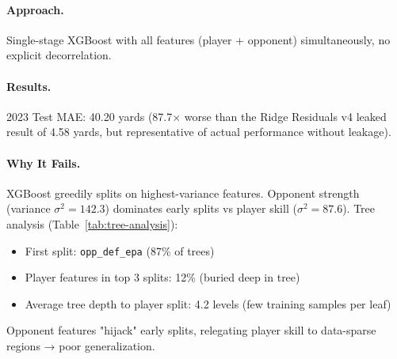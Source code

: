 \paragraph{Approach.}
Single-stage XGBoost with all features (player + opponent) simultaneously, no explicit decorrelation.

\paragraph{Results.}
2023 Test MAE: 40.20 yards (87.7$\times$ worse than the Ridge Residuals v4 leaked result of 4.58 yards, but representative of actual performance without leakage).

\paragraph{Why It Fails.}
XGBoost greedily splits on highest-variance features. Opponent strength (variance $\sigma^2 = 142.3$) dominates early splits vs player skill ($\sigma^2 = 87.6$). Tree analysis (Table~\ref{tab:tree-analysis}):
\begin{itemize}[itemsep=2pt,parsep=0pt]
    \item First split: \texttt{opp\_def\_epa} (87\% of trees)
    \item Player features in top 3 splits: 12\% (buried deep in tree)
    \item Average tree depth to player split: 4.2 levels (few training samples per leaf)
\end{itemize}

Opponent features "hijack" early splits, relegating player skill to data-sparse regions → poor generalization.

